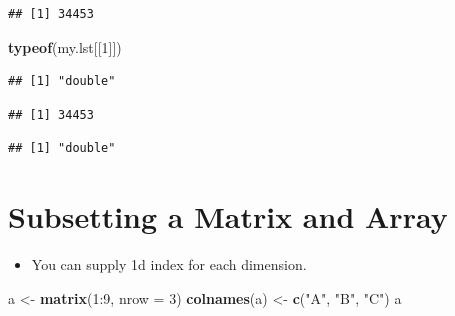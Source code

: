 \documentclass[]{book}
\newenvironment{Shaded}{\begin{snugshade}}{\end{snugshade}}
\newcommand{\KeywordTok}[1]{\textcolor[rgb]{0.13,0.29,0.53}{\textbf{{#1}}}}
\newcommand{\DataTypeTok}[1]{\textcolor[rgb]{0.13,0.29,0.53}{{#1}}}
\newcommand{\DecValTok}[1]{\textcolor[rgb]{0.00,0.00,0.81}{{#1}}}
\newcommand{\StringTok}[1]{\textcolor[rgb]{0.31,0.60,0.02}{{#1}}}
\newcommand{\CommentTok}[1]{\textcolor[rgb]{0.56,0.35,0.01}{\textit{{#1}}}}
\newcommand{\NormalTok}[1]{{#1}}
\providecommand{\tightlist}{%
  \setlength{\itemsep}{0pt}\setlength{\parskip}{0pt}}
\begin{document}
\begin{verbatim}
## [1] 34453
\end{verbatim}

\begin{Shaded}
\begin{Highlighting}[]
\KeywordTok{typeof}\NormalTok{(my.lst[[}\DecValTok{1}\NormalTok{]])}
\end{Highlighting}
\end{Shaded}

\begin{verbatim}
## [1] "double"
\end{verbatim}

\begin{Shaded}
\end{Shaded}

\begin{verbatim}
## [1] 34453
\end{verbatim}

\begin{Shaded}
\end{Shaded}

\begin{verbatim}
## [1] "double"
\end{verbatim}

\section{Subsetting a Matrix and
Array}\label{subsetting-a-matrix-and-array}

\begin{itemize}
\tightlist
\item
  You can supply 1d index for each dimension.
\end{itemize}

\begin{Shaded}
\begin{Highlighting}[]
\NormalTok{a <-}\StringTok{ }\KeywordTok{matrix}\NormalTok{(}\DecValTok{1}\NormalTok{:}\DecValTok{9}\NormalTok{, }\DataTypeTok{nrow =} \DecValTok{3}\NormalTok{)}
\KeywordTok{colnames}\NormalTok{(a) <-}\StringTok{ }\KeywordTok{c}\NormalTok{(}\StringTok{"A"}\NormalTok{, }\StringTok{"B"}\NormalTok{, }\StringTok{"C"}\NormalTok{)}
\NormalTok{a}
\end{Highlighting}
\end{Shaded}
\end{document}
